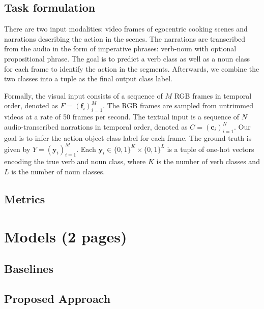 \documentclass[11pt,a4paper]{article}
\begin{document}
\subsection{Task formulation}
There are two input modalities: video frames of egocentric cooking scenes and narrations describing the action in the scenes. The narrations are transcribed from the audio in the form of imperative phrases: verb-noun with optional propositional phrase. The goal is to predict a verb class as well as a noun class for each frame to identify the action in the segments. Afterwards, we combine the two classes into a tuple as the final output class label. 

Formally, the visual input consists of a sequence of $M$ RGB frames in temporal order, denoted as $F=(\mathbf{f}_i)_{i=1}^M$. The RGB frames are sampled from untrimmed videos at a rate of 50 frames per second. The textual input is a sequence of $N$ audio-transcribed narrations in temporal order, denoted as $C=(\mathbf{c}_i)_{i=1}^N$. Our goal is to infer the action-object class label for each frame. The ground truth is given by $Y=(\mathbf{y}_i)_{i=1}^M$. Each $\mathbf{y}_i\in\{0,1\}^K\times\{0,1\}^L$ is a tuple of one-hot vectors encoding the true verb and noun class, where $K$ is the number of verb classes and $L$ is the number of noun classes.





\subsection{Metrics}



\clearpage
\section{Models (2 pages)}

\subsection{Baselines}



\subsection{Proposed Approach}
\end{document}
